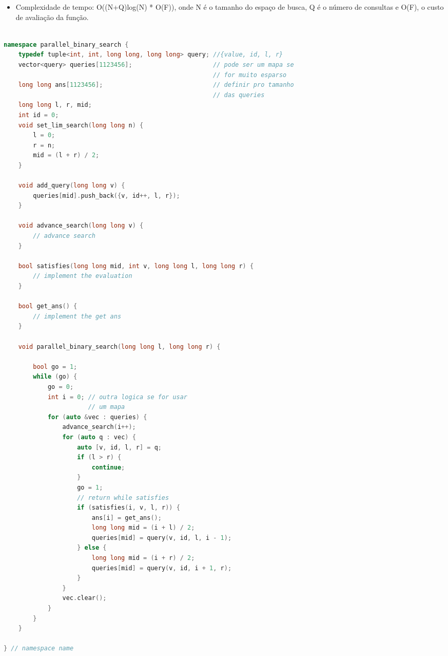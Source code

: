 \documentclass[11pt, a4paper, oneside]{book}
\begin{document}
\begin{itemize}
\item Complexidade de tempo: O((N+Q)log(N) * O(F)), onde N é o tamanho do espaço de busca, Q é o número de consultas e O(F), o custo de avaliação da função.
\end{itemize}

\hfill

\begin{multicols}{2}
\begin{lstlisting}[language=C++]

namespace parallel_binary_search {
    typedef tuple<int, int, long long, long long> query; //{value, id, l, r}
    vector<query> queries[1123456];                      // pode ser um mapa se
                                                         // for muito esparso
    long long ans[1123456];                              // definir pro tamanho
                                                         // das queries
    long long l, r, mid;
    int id = 0;
    void set_lim_search(long long n) {
        l = 0;
        r = n;
        mid = (l + r) / 2;
    }

    void add_query(long long v) {
        queries[mid].push_back({v, id++, l, r});
    }

    void advance_search(long long v) {
        // advance search
    }

    bool satisfies(long long mid, int v, long long l, long long r) {
        // implement the evaluation
    }

    bool get_ans() {
        // implement the get ans
    }

    void parallel_binary_search(long long l, long long r) {

        bool go = 1;
        while (go) {
            go = 0;
            int i = 0; // outra logica se for usar
                       // um mapa
            for (auto &vec : queries) {
                advance_search(i++);
                for (auto q : vec) {
                    auto [v, id, l, r] = q;
                    if (l > r) {
                        continue;
                    }
                    go = 1;
                    // return while satisfies
                    if (satisfies(i, v, l, r)) {
                        ans[i] = get_ans();
                        long long mid = (i + l) / 2;
                        queries[mid] = query(v, id, l, i - 1);
                    } else {
                        long long mid = (i + r) / 2;
                        queries[mid] = query(v, id, i + 1, r);
                    }
                }
                vec.clear();
            }
        }
    }

} // namespace name
\end{lstlisting}
\end{multicols}
\end{document}
